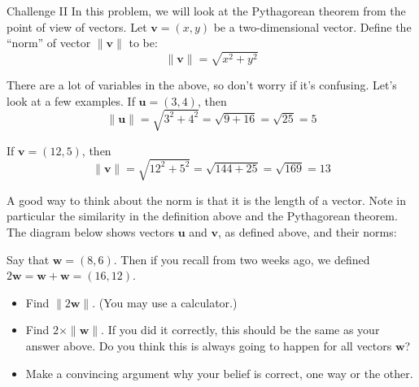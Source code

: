 \documentclass[14pt,letterpaper]{article}
\begin{document}
\begin{problem}{Challenge II}
  In this problem, we will look at the Pythagorean theorem from the point of
  view of vectors. Let \(\mathbf{v}=(x, y)\) be a two-dimensional vector.
  Define the ``norm'' of vector \(\|\mathbf{v}\|\) to be: \[ \|\mathbf{v}\| =
  \sqrt{x^2 + y^2} \]

  There are a lot of variables in the above, so don't worry if it's confusing.
  Let's look at a few examples. If \(\mathbf{u} = (3, 4)\), then \[
    \|\mathbf{u}\| = \sqrt{3^2 + 4^2} = \sqrt{9 + 16} = \sqrt{25} = 5
  \]

  If \(\mathbf{v} = (12, 5)\), then \[
    \|\mathbf{v}\| = \sqrt{12^2 + 5^2} = \sqrt{144 + 25} = \sqrt{169} = 13
  \]

  A good way to think about the norm is that it is the length of a vector. Note
  in particular the similarity in the definition above and the Pythagorean
  theorem. The diagram below shows vectors \(\mathbf{u}\) and \(\mathbf{v}\),
  as defined above, and their norms:

  \begin{center}
  \end{center}

  Say that \(\mathbf{w} = (8, 6)\). Then if you recall from two weeks ago, we
  defined \(2\mathbf{w} = \mathbf{w} + \mathbf{w} = (16, 12)\).

  \begin{itemize}
    \item Find \(\|2\mathbf{w}\|\). (You may use a calculator.)
    \item Find \(2\times\|\mathbf{w}\|\). If you did it correctly, this should
    be the same as your answer above. Do you think this is always going to
    happen for all vectors \(\mathbf{w}\)?
    \item Make a convincing argument why your belief is correct, one way or the
    other.
  \end{itemize}
\end{problem}
\end{document}
